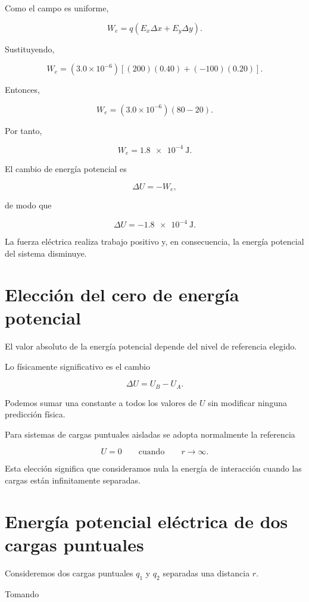 Como el campo es uniforme,

\[
W_e=q(E_x\Delta x+E_y\Delta y).
\]

Sustituyendo,

\[
W_e
=
(3.0\times10^{-6})
\left[
(200)(0.40)+(-100)(0.20)
\right].
\]

Entonces,

\[
W_e
=
(3.0\times10^{-6})(80-20).
\]

Por tanto,

\[
\boxed{W_e=\SI{1.8e-4}{\joule}}.
\]

El cambio de energía potencial es

\[
\Delta U=-W_e,
\]

de modo que

\[
\boxed{\Delta U=-\SI{1.8e-4}{\joule}}.
\]

La fuerza eléctrica realiza trabajo positivo y, en consecuencia, la energía potencial
del sistema disminuye.


\section{Elección del cero de energía potencial}

El valor absoluto de la energía potencial depende del nivel de referencia elegido.

Lo físicamente significativo es el cambio

\[
\Delta U=U_B-U_A.
\]

Podemos sumar una constante a todos los valores de \(U\) sin modificar ninguna
predicción física.

Para sistemas de cargas puntuales aisladas se adopta normalmente la referencia

\begin{equation}
\boxed{
U=0
\qquad\text{cuando}\qquad
r\to\infty
}.
\label{eq:cero_energia_infinito}
\end{equation}

Esta elección significa que consideramos nula la energía de interacción cuando las
cargas están infinitamente separadas.


\section{Energía potencial eléctrica de dos cargas puntuales}

Consideremos dos cargas puntuales \(q_1\) y \(q_2\) separadas una distancia \(r\).

Tomando

